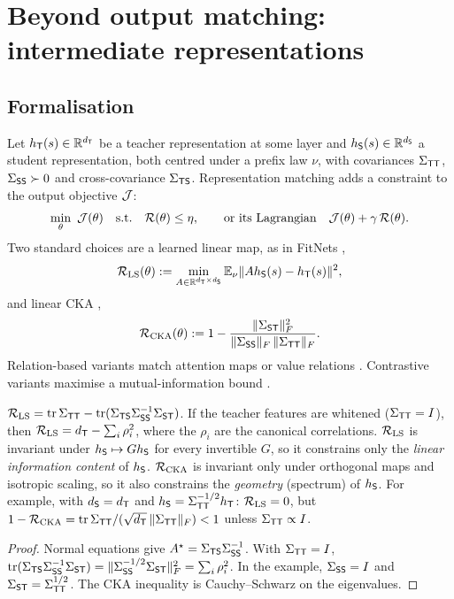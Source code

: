 \section{Beyond output matching: intermediate representations}\label{sec:repr}

\subsection{Formalisation}

Let $h_{\mathsf{T}}(s)\in\mathbb{R}^{d_{\mathsf{T}}}$ be a teacher representation at some layer and $h_{\mathsf{S}}(s)\in\mathbb{R}^{d_{\mathsf{S}}}$ a student
representation, both centred under a prefix law $\nu$, with covariances $\Sigma_{\mathsf{T}\mathsf{T}}$, $\Sigma_{\mathsf{S}\mathsf{S}}\succ0$ and
cross-covariance $\Sigma_{\mathsf{T}\mathsf{S}}$. Representation matching adds a constraint to the output objective $\mathcal{J}$:
\[
\min_\theta\ \cJ(\theta)\quad\text{s.t.}\quad\cR(\theta)\le\eta,
\qquad\text{or its Lagrangian}\quad\cJ(\theta)+\gamma\,\cR(\theta).
\]
Two standard choices are a learned linear map, as in FitNets \citep{romero2015fitnets},
\[
\mathcal{R}_{\mathrm{LS}}(\theta):=\min_{A\in\mathbb{R}^{d_{\mathsf{T}}\times d_{\mathsf{S}}}}\mathbb{E}_\nu\|Ah_{\mathsf{S}}(s)-h_{\mathsf{T}}(s)\|^2,
\]
and linear CKA \citep{kornblith2019similarity},
\[
\mathcal{R}_{\mathrm{CKA}}(\theta):=1-\frac{\|\Sigma_{\mathsf{S}\mathsf{T}}\|_F^2}{\|\Sigma_{\mathsf{S}\mathsf{S}}\|_F\,\|\Sigma_{\mathsf{T}\mathsf{T}}\|_F}.
\]
Relation-based variants match attention maps or value relations \citep{zagoruyko2017paying,jiao2020tinybert,wang2020minilm,sun2020mobilebert}.
Contrastive variants maximise a mutual-information bound \citep{tian2020contrastive}.

\begin{proposition}\label{prop:cca}
\Pv\Ck
$\mathcal{R}_{\mathrm{LS}}=\operatorname{tr}\Sigma_{\mathsf{T}\mathsf{T}}-\operatorname{tr}(\Sigma_{\mathsf{T}\mathsf{S}}\Sigma_{\mathsf{S}\mathsf{S}}^{-1}\Sigma_{\mathsf{S}\mathsf{T}})$. If the teacher features are whitened
($\Sigma_{\mathsf{T}\mathsf{T}}=I$), then $\mathcal{R}_{\mathrm{LS}}=d_{\mathsf{T}}-\sum_i\rho_i^2$, where the $\rho_i$ are the canonical correlations.
$\mathcal{R}_{\mathrm{LS}}$ is invariant under $h_{\mathsf{S}}\mapsto Gh_{\mathsf{S}}$ for every invertible $G$, so it constrains only the
\emph{linear information content} of $h_{\mathsf{S}}$. $\mathcal{R}_{\mathrm{CKA}}$ is invariant only under orthogonal maps and
isotropic scaling, so it also constrains the \emph{geometry} (spectrum) of $h_{\mathsf{S}}$. For example, with
$d_{\mathsf{S}}=d_{\mathsf{T}}$ and $h_{\mathsf{S}}=\Sigma_{\mathsf{T}\mathsf{T}}^{-1/2}h_{\mathsf{T}}$: $\mathcal{R}_{\mathrm{LS}}=0$, but
$1-\mathcal{R}_{\mathrm{CKA}}=\operatorname{tr}\Sigma_{\mathsf{T}\mathsf{T}}/(\sqrt{d_{\mathsf{T}}}\,\|\Sigma_{\mathsf{T}\mathsf{T}}\|_F)<1$ unless $\Sigma_{\mathsf{T}\mathsf{T}}\propto I$.
\end{proposition}
\begin{proof}
Normal equations give $A^\star=\Sigma_{\mathsf{T}\mathsf{S}}\Sigma_{\mathsf{S}\mathsf{S}}^{-1}$. With $\Sigma_{\mathsf{T}\mathsf{T}}=I$,
$\operatorname{tr}(\Sigma_{\mathsf{T}\mathsf{S}}\Sigma_{\mathsf{S}\mathsf{S}}^{-1}\Sigma_{\mathsf{S}\mathsf{T}})=\|\Sigma_{\mathsf{S}\mathsf{S}}^{-1/2}\Sigma_{\mathsf{S}\mathsf{T}}\|_F^2=\sum_i\rho_i^2$. In the
example, $\Sigma_{\mathsf{S}\mathsf{S}}=I$ and $\Sigma_{\mathsf{S}\mathsf{T}}=\Sigma_{\mathsf{T}\mathsf{T}}^{1/2}$. The CKA inequality is Cauchy--Schwarz on the
eigenvalues.
\end{proof}


